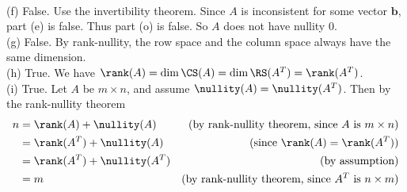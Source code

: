 \begin{solution}
\\
(f) False. Use the invertibility theorem. Since $A$ is inconsistent for some vector $\textbf{b}$, part (e) is false. Thus part (o) is false. So $A$ does not have nullity 0.
\\
(g) 
False. By rank-nullity, the row space and the column space always have the same dimension.
\\
(h) True. We have $\rank(A)=\dim\CS(A)=\dim\RS(A^T)=\rank(A^T)$. 
\\
(i) True. Let $A$ be $m\times n$, and assume $\nullity(A)=\nullity(A^T)$.  Then by the rank-nullity theorem 
\begin{align*}
n&=\rank(A)+\nullity(A)&\text{(by rank-nullity theorem, since $A$ is $m\times n$)}
\\
&=\rank(A^T)+\nullity(A) &\text{(since $\rank(A)=\rank(A^T)$)}\\
&=\rank(A^T)+\nullity(A^T) &\text{(by assumption)}\\
&=m &\text{(by rank-nullity theorem, since $A^T$ is $n\times m$)}
\end{align*}

\end{solution}


\ee
